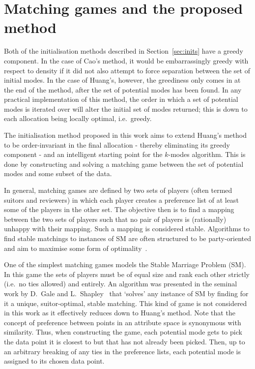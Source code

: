 \section{Matching games and the proposed method}\label{sec:method}

Both of the initialisation methods described in Section~\ref{sec:inits} have a
greedy component. In the case of Cao's method, it would be embarrassingly greedy
with respect to density if it did not also attempt to force separation between
the set of initial modes. In the case of Huang's, however, the greediness only
comes in at the end of the method, after the set of potential modes has been
found. In any practical implementation of this method, the order in which a set
of potential modes is iterated over will alter the initial set of modes
returned; this is down to each allocation being locally optimal, i.e.\ greedy.

The initialisation method proposed in this work aims to extend Huang's method to
be order-invariant in the final allocation \-- thereby eliminating its greedy
component \-- and an intelligent starting point for the \(k\)-modes algorithm.
This is done by constructing and solving a matching game between the set of
potential modes and some subset of the data.

In general, matching games are defined by two sets of players (often termed
suitors and reviewers) in which each player creates a preference list of at
least some of the players in the other set. The objective then is to find a
mapping between the two sets of players such that no pair of players is
(rationally) unhappy with their mapping. Such a mapping is considered stable.
Algorithms to find stable matchings to instances of SM are often structured to
be party-oriented and aim to maximise some form of
optimality~\cite{Fuku2006,Gale1962,Kwanashie2015}.

One of the simplest matching games models the Stable Marriage Problem (SM). In
this game the sets of players must be of equal size and rank each other strictly
(i.e.\ no ties allowed) and entirely. An algorithm was presented in the seminal
work by D.\ Gale and L.\ Shapley~\cite{Gale1962} that `solves' any instance of
SM by finding for it a unique, suitor-optimal, stable matching. This kind of
game is not considered in this work as it effectively reduces down to Huang's
method.  Note that the concept of preference between points in an attribute
space is synonymous with similarity. Thus, when constructing the game, each
potential mode gets to pick the data point it is closest to but that has not
already been picked. Then, up to an arbitrary breaking of any ties in the
preference lists, each potential mode is assigned to its chosen data point.


